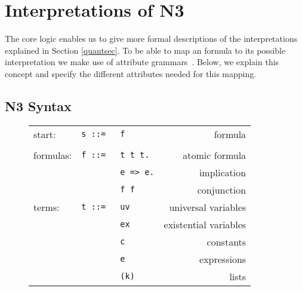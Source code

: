 
\section{Interpretations of N3}\label{n3}
The core logic enables us to give more formal descriptions of the \nthree interpretations explained in Section \ref{quantsec}.
To be able to map an \nthree formula to its possible interpretation we make use of attribute grammars~\cite{attributegrammar,ag2}. 
Below, we explain this concept and specify the different attributes needed for this mapping.



\subsection{N3 Syntax}\label{n3synsec}
\begin{figure}
\begin{tabular}{lllr}
  \hline
start:\hspace{0.2\textwidth} & \texttt{s ::=} %
& \texttt{f}& formula\\
&      &&\\
formulas: & \texttt{f ::= }%
    &  \texttt{t t t.}&                atomic formula\\
&    &  \texttt{e => e.}& implication\\
&    &  \texttt{f f} &                 conjunction\\
 terms:& \texttt{t ::=}%
      & \texttt{uv}\hspace{0.2\textwidth} &                universal variables\\
&            & \texttt{ex} &                existential variables\\
&      & \texttt{c} &                constants\\
&      & \texttt{e} &                 expressions\\
&      & \texttt{(k)}& lists\\

\end{tabular}
\end{figure}
